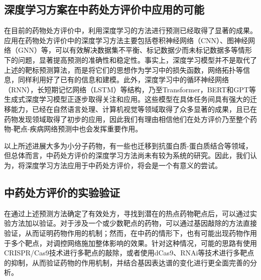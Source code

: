 \subsection{深度学习方案在中药处方评价中应用的可能}

在目前的药物处方评价中，利用深度学习的方法进行预测已经取得了显著的成果。应用在药物处方评价中的深度学习方法主要包括卷积神经网络（CNN）、图神经网络（GNN）等\cite{Tsubaki_Tomii_Sese_2019}，可以有效解决数据集不平衡、标记数据少而未标记数据多等情形下的问题，显著提高预测的准确性和稳定性。事实上，深度学习模型并不是取代了上述的靶标预测算法，而是将它们的思想作为学习中的损失函数，网络拓扑等信息，同样利用好了已有的信息和建模。此外，深度学习中的循环神经网络（RNN），长短期记忆网络（LSTM）等结构，乃至Transformer，BERT和GPT等生成式深度学习模型正逐步取得关注和应用。这些模型在具体任务间具有强大的迁移能力，已经在自然语言处理、计算机视觉等领域取得了众多显著的成果，且已在药物发现领域取得了初步的应用，因此我们有理由相信他们在处方评价乃至整个药物-靶点-疾病网络预测中也会发挥重要作用\cite{Haroon_C.a._A.s._2023}。

以上所述进展大多为小分子药物，有一些也迁移到抗蛋白质-蛋白质结合等领域，但总体而言，中药处方评价的深度学习方法尚未有较为系统的研究。因此，我们认为，将深度学习方法应用于中药处方评价，将会是一个有意义的尝试。

\subsection{中药处方评价的实验验证}

在通过上述预测方法确定了有效处方，寻找到潜在的热点药物靶点后，可以通过实验方法加以验证。对于涉及一个或少数靶点的药物，可以通过基因敲除的方法直接验证，从而证明药物作用的机制；然而，在中药的情形下，也有可能出现药物作用于多个靶点，对调控网络施加整体影响的效果。针对这种情况，可能的思路有使用CRISPR/Cas9\cite{Cong_Ran_Cox_Lin_Barretto_Habib_Hsu_Wu_Jiang_Marraffini_et_al._2013}技术进行多靶点的敲除，或者使用dCas9\cite{Jiang_Geng_Wang_Liang_Guo_Liu_Zhao_Jin_Liu_Mu_2023}、RNAi\cite{Zimmermann_Lehár_Keith_2007}等技术进行多靶点的抑制，从而验证药物的作用机制，并结合基因表达谱的变化进行更全面完善的分析。
